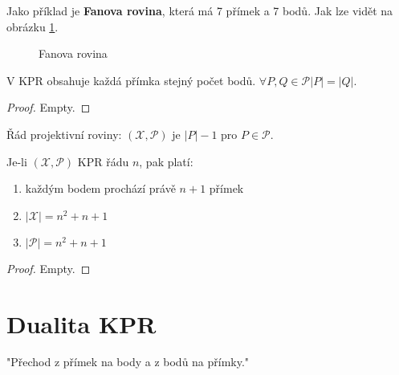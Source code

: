 Jako příklad je \textbf{Fanova rovina}, která má 7 přímek a 7 bodů. Jak lze vidět na obrázku \ref{fans-plane}.

\begin{figure}[!h]\centering
	\caption{Fanova rovina}
	\label{fans-plane}
\end{figure}

\begin{tvrz}
	V KPR obsahuje každá přímka stejný počet bodů. $\forall P,Q \in \mathcal{P} |P|=|Q|$.
\end{tvrz}

\begin{proof}
	Empty.
\end{proof}

\begin{definice}
	Řád projektivní roviny: $(\mathcal{X}, \mathcal{P})$ je $|P|-1$ pro $P \in \mathcal{P}$.
\end{definice} 

\begin{tvrz}
	Je-li $(\mathcal{X}, \mathcal{P})$ KPR řádu $n$, pak platí:
	
	\begin{enumerate}
		\item každým bodem prochází právě $n+1$ přímek
		\item $|\mathcal{X}| = n^{2} + n + 1$
		\item$|\mathcal{P}| = n^{2} + n + 1$
	\end{enumerate}
\end{tvrz}

\begin{proof}
	Empty.
\end{proof}

\section{Dualita KPR}

"Přechod z přímek na body a z bodů na přímky."

